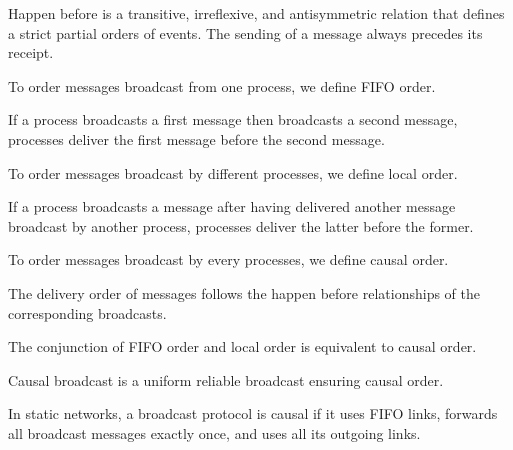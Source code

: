 \begin{definition}
  Happen before is a transitive, irreflexive, and antisymmetric relation that
  defines a strict partial orders of events.  The sending of a message always
  precedes its receipt.
\end{definition}

To order messages broadcast from one process, we define FIFO order.

\begin{definition}
  If a process broadcasts a first message then broadcasts a second message,
  processes deliver the first message before the second message.
\end{definition}

To order messages broadcast by different processes, we define local order.

\begin{definition}
  If a process broadcasts a message after having delivered another message
  broadcast by another process, processes deliver the latter before the former.
\end{definition}

To order messages broadcast by every processes, we define causal order.

\begin{definition}
  The delivery order of messages follows the happen before relationships of the
  corresponding broadcasts.
\end{definition}

\begin{theorem}
  The conjunction of FIFO order and local order is equivalent to causal order.
\end{theorem}

\begin{definition}
  Causal broadcast is a uniform reliable broadcast ensuring causal order.
\end{definition}

\begin{theorem}
  In static networks, a broadcast protocol is causal if it uses FIFO links,
  forwards all broadcast messages exactly once, and uses all its outgoing links.
\end{theorem}

